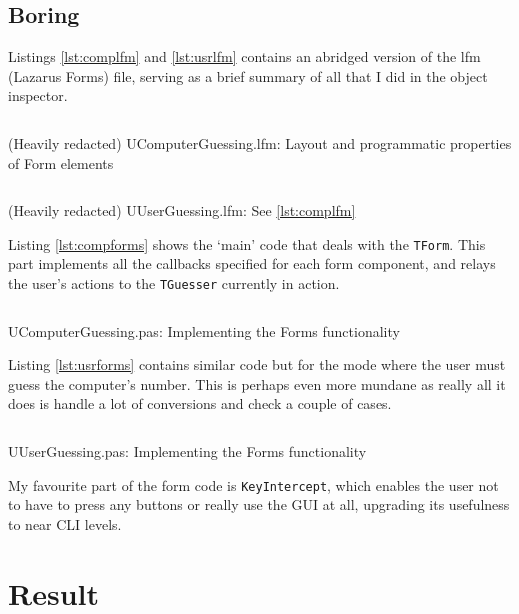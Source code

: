 \documentclass[a4paper,11pt]{article}
\newenvironment{longlisting}
{\addvspace{\baselineskip}\captionsetup{type=listing}}
{\addvspace{\baselineskip}}
\begin{document}
    \subsection{Boring}

    Listings \ref{lst:complfm} and \ref{lst:usrlfm} contains an abridged version
    of the lfm (Lazarus Forms) file, serving as a brief summary of all that I
    did in the object inspector.

\begin{longlisting}
\inputminted{pascal}{UComputerGuessing.lfm}
\caption{(Heavily redacted) UComputerGuessing.lfm: Layout and programmatic
properties of Form elements}
\label{lst:complfm}
\end{longlisting}

\begin{longlisting}
\inputminted{pascal}{UUserGuessing.lfm}
\caption{(Heavily redacted) UUserGuessing.lfm: See \ref{lst:complfm}}
\label{lst:usrlfm}
\end{longlisting}

    Listing \ref{lst:compforms} shows the `main' code that deals with the
    \texttt{TForm}. This part implements all the callbacks specified for each
    form component, and relays the user's actions to the \texttt{TGuesser}
    currently in action.

\begin{longlisting}
\inputminted{Pascal}{../UComputerGuessing.pas}
\caption{UComputerGuessing.pas: Implementing the Forms functionality}
\label{lst:compforms}
\end{longlisting}

    Listing \ref{lst:usrforms} contains similar code but for the mode where the
    user must guess the computer's number. This is perhaps even more mundane as
    really all it does is handle a lot of conversions and check a couple of
    cases.

\begin{longlisting}
\inputminted{Pascal}{../UUserGuessing.pas}
\caption{UUserGuessing.pas: Implementing the Forms functionality}
\label{lst:usrforms}
\end{longlisting}

    My favourite part of the form code is \texttt{KeyIntercept}, which enables
    the user not to have to press any buttons or really use the GUI at all,
    upgrading its usefulness to near CLI levels.

    \section{Result}
\end{document}

